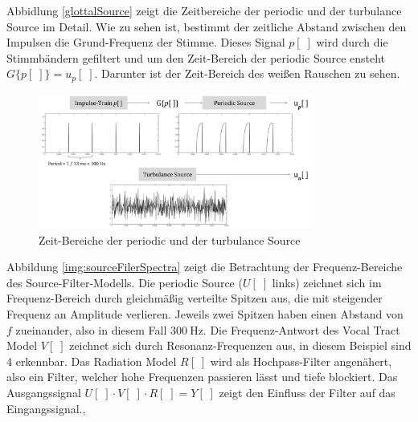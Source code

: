 Abbidlung \ref{glottalSource} zeigt die Zeitbereiche der periodic und der turbulance Source im Detail. Wie zu sehen ist, bestimmt der zeitliche Abstand zwischen den Impulsen die Grund-Frequenz der Stimme. Dieses Signal $p[\;]$ wird durch die Stimmbändern gefiltert und um den Zeit-Bereich der periodic Source ensteht $G\{p[\;]\} = u_p[\;]$. Darunter ist der Zeit-Bereich des weißen Rauschen zu sehen. \cite[Source]{speechAcoustics}

\begin{figure}[h]
	\centering
	\includegraphics[width=0.8\textwidth]{bilder/glottalSource.png}
	\caption{Zeit-Bereiche der periodic und der turbulance Source \cite[Source]{speechAcoustics}}
	\label{img:glottalSource}
\end{figure}	

Abbildung \ref{img:sourceFilerSpectra} zeigt die Betrachtung der Frequenz-Bereiche des Source-Filter-Modells. Die periodic Source ($U[\;]$ links) zeichnet sich im Frequenz-Bereich durch gleichmäßig verteilte Spitzen aus, die mit steigender Frequenz an Amplitude verlieren. Jeweils zwei Spitzen haben einen Abstand von $f$ zueinander, also in diesem Fall $\SI{300}{\hertz}$. Die Frequenz-Antwort des Vocal Tract Model $V[\;]$ zeichnet sich durch Resonanz-Frequenzen aus, in diesem Beispiel sind 4 erkennbar. Das Radiation Model $R[\;]$ wird als Hochpass-Filter angenähert, also ein Filter, welcher hohe Frequenzen passieren lässt und tiefe blockiert. Das Ausgangssignal $U[\;] \cdot V[\;] \cdot R[\;] = Y[\;] $ zeigt den Einfluss der Filter auf das Eingangssignal.\cite[Source estimation]{ricardo_ceps}, \cite[Vocal Tract Resonance]{speechAcoustics}

